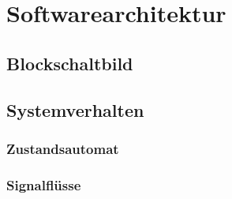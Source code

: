\chapter{Softwarearchitektur}

\section{Blockschaltbild}

\section{Systemverhalten}

\subsection{Zustandsautomat}

\subsection{Signalflüsse}

